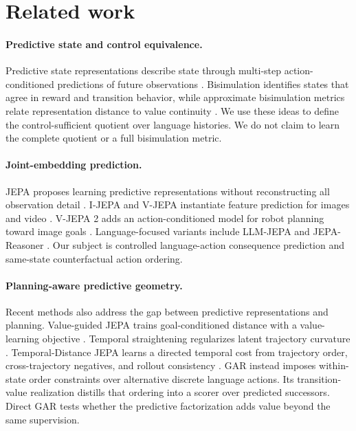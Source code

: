\section{Related work}
\label{sec:related}

\paragraph{Predictive state and control equivalence.}
Predictive state representations describe state through multi-step action-conditioned predictions of future observations \citep{littman2001predictive}. Bisimulation identifies states that agree in reward and transition behavior, while approximate bisimulation metrics relate representation distance to value continuity \citep{ferns2011bisimulation}. We use these ideas to define the control-sufficient quotient over language histories. We do not claim to learn the complete quotient or a full bisimulation metric.

\paragraph{Joint-embedding prediction.}
JEPA proposes learning predictive representations without reconstructing all observation detail \citep{lecun2022path}. I-JEPA and V-JEPA instantiate feature prediction for images and video \citep{assran2023ijepa,bardes2024vjepa}. V-JEPA 2 adds an action-conditioned model for robot planning toward image goals \citep{assran2025vjepa2}. Language-focused variants include LLM-JEPA and JEPA-Reasoner \citep{huang2025llmjepa,jepareasoner2026}. Our subject is controlled language-action consequence prediction and same-state counterfactual action ordering.

\paragraph{Planning-aware predictive geometry.}
Recent methods also address the gap between predictive representations and planning. Value-guided JEPA trains goal-conditioned distance with a value-learning objective \citep{destrade2026value}. Temporal straightening regularizes latent trajectory curvature \citep{wang2026straightening}. Temporal-Distance JEPA learns a directed temporal cost from trajectory order, cross-trajectory negatives, and rollout consistency \citep{bai2026tdjepa}. GAR instead imposes within-state order constraints over alternative discrete language actions. Its transition-value realization distills that ordering into a scorer over predicted successors. Direct GAR tests whether the predictive factorization adds value beyond the same supervision.

